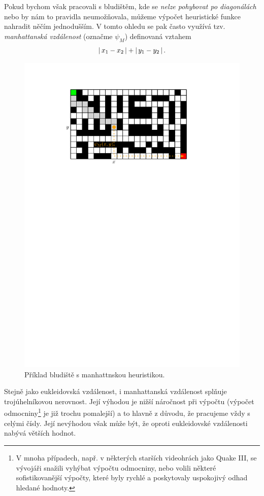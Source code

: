 Pokud bychom však pracovali s bludištěm, kde se \emph{nelze pohybovat po diagonálách} nebo by nám to pravidla neumožňovala, můžeme výpočet heuristické funkce nahradit něčím jednodušším. V tomto ohledu se pak často využívá tzv. \emph{manhattanská vzdálenost} (označme $\psi_M$) definovaná vztahem
\[\left|\,x_1-x_2\,\right|+\left|\,y_1-y_2\,\right|.\]
\begin{figure}[h]
    \centering
    \includegraphics[scale=\graphimgsize]{01-grafalgo/images/ch01_astar_mrizka_manhattan.pdf}
    \caption{Příklad bludiště s manhattnskou heuristikou.}
    \label{fig:astar_bludiste_manhattan}
\end{figure}
Stejně jako eukleidovská vzdálenost, i manhattanská vzdálenost splňuje trojúhelníkovou nerovnost. Její výhodou je nižší náročnost při výpočtu (výpočet odmocniny\footnote{V mnoha případech, např. v některých starších videohrách jako Quake III, se vývojáři snažili vyhýbat výpočtu odmocniny, nebo volili některé sofistikovanější výpočty, které byly rychlé a poskytovaly uspokojivý odhad hledané hodnoty.} je již trochu pomalejší) a to hlavně z důvodu, že pracujeme vždy s celými čísly. Její nevýhodou však může být, že oproti eukleidovské vzdálenosti nabývá větších hodnot.